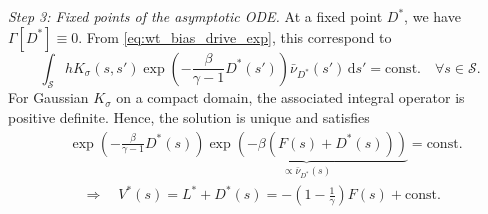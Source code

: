 \documentclass[]{fairmeta}
\theoremstyle{remark}
\begin{document}
\textit{Step 3: Fixed points of the asymptotic ODE.}
At a fixed point $D^\ast$, we have $\Gamma[D^\ast] \equiv 0$.
From \cref{eq:wt_bias_drive_exp}, this correspond to
\begin{equation}
\int_\mathcal{S} h K_\sigma (s, s') \exp\left(- \frac{\beta}{\gamma - 1}D^\ast(s')\right) \bar{\nu}_{D^\ast}(s') \, \mathrm{d}s' = \mathrm{const.} \quad \forall s \in \mathcal{S}.
\end{equation}
For Gaussian $K_\sigma$ on a compact domain, the associated integral operator is positive definite.
Hence, the solution is unique and satisfies
\begin{align}
& \exp\left(-\frac{\beta}{\gamma - 1}D^\ast(s)\right) \underbrace{\exp(-\beta(F(s) + D^\ast(s)))}_{\propto \bar{\nu}_{D^\ast}(s)} = \mathrm{const.} \\
& \quad \Longrightarrow \quad V^\ast(s) = L^\ast + D^\ast(s) = - \left( 1 - \frac{1}{\gamma} \right) F(s) + \mathrm{const.} \label{eq:asymp_bias}
\end{align}
\end{document}
